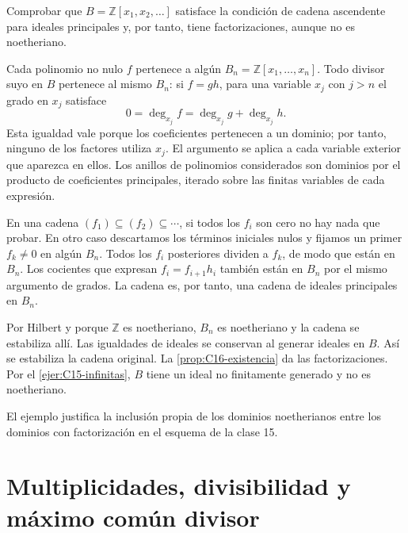 \begin{ejer}\label{ejer:C16-infinitas}
Comprobar que $B=\mathbb Z[x_1,x_2,\ldots]$ satisface la condición de cadena ascendente para ideales principales y, por tanto, tiene factorizaciones, aunque no es noetheriano.
\end{ejer}
\begin{sol}
Cada polinomio no nulo $f$ pertenece a algún $B_n=\mathbb Z[x_1,\ldots,x_n]$. Todo divisor suyo en $B$ pertenece al mismo $B_n$: si $f=gh$, para una variable $x_j$ con $j>n$ el grado en $x_j$ satisface
\[
0=\deg_{x_j}f=\deg_{x_j}g+\deg_{x_j}h.
\]
Esta igualdad vale porque los coeficientes pertenecen a un dominio; por tanto, ninguno de los factores utiliza $x_j$. El argumento se aplica a cada variable exterior que aparezca en ellos. Los anillos de polinomios considerados son dominios por el producto de coeficientes principales, iterado sobre las finitas variables de cada expresión.

En una cadena $(f_1)\subseteq(f_2)\subseteq\cdots$, si todos los $f_i$ son cero no hay nada que probar. En otro caso descartamos los términos iniciales nulos y fijamos un primer $f_k\ne0$ en algún $B_n$. Todos los $f_i$ posteriores dividen a $f_k$, de modo que están en $B_n$. Los cocientes que expresan $f_i=f_{i+1}h_i$ también están en $B_n$ por el mismo argumento de grados. La cadena es, por tanto, una cadena de ideales principales en $B_n$.

Por Hilbert y porque $\mathbb Z$ es noetheriano, $B_n$ es noetheriano y la cadena se estabiliza allí. Las igualdades de ideales se conservan al generar ideales en $B$. Así se estabiliza la cadena original. La \cref{prop:C16-existencia} da las factorizaciones. Por el \cref{ejer:C15-infinitas}, $B$ tiene un ideal no finitamente generado y no es noetheriano.
\end{sol}
El ejemplo justifica la inclusión propia de los dominios noetherianos entre los dominios con factorización en el esquema de la clase 15.

\section{Multiplicidades, divisibilidad y máximo común divisor}
